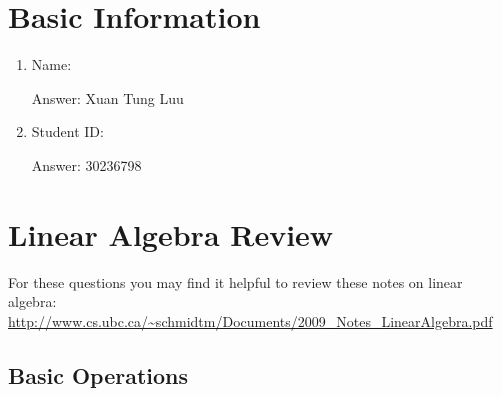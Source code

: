 \documentclass{article}
\def\ans#1{\par\gre{Answer: #1}}
\def\blu#1{{\color{blu}#1}}
\def\gre#1{{\color{gre}#1}}
\def\enum#1{\begin{enumerate}#1\end{enumerate}}
\begin{document}
\section*{Basic Information}

\blu{
	\enum{
\item Name:
\ans{Xuan Tung Luu}
\item Student ID:
\ans{30236798}
	}
}

\clearpage

\section{Linear Algebra Review}

For these questions you may find it helpful to review these notes on linear algebra:\\
\url{http://www.cs.ubc.ca/~schmidtm/Documents/2009_Notes_LinearAlgebra.pdf}

\subsection{Basic Operations}
\end{document}
